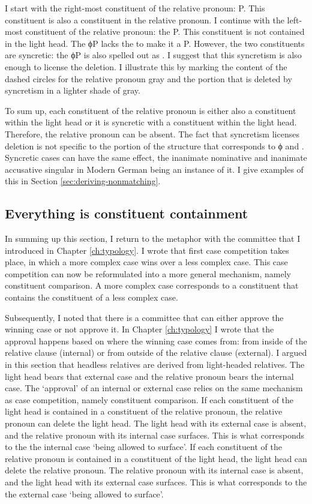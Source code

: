 I start with the right-most constituent of the relative pronoun: P. This constituent is also a constituent in the relative pronoun.
I continue with the left-most constituent of the relative pronoun: the P. This constituent is not contained in the light head. The ϕP lacks the  to make it a P. However, the two constituents are syncretic: the ϕP is also spelled out as . I suggest that this syncretism is also enough to license the deletion. I illustrate this by marking the content of the dashed circles for the relative pronoun gray and the portion that is deleted by syncretism in a lighter shade of gray.

To sum up, each constituent of the relative pronoun is either also a constituent within the light head or it is syncretic with a constituent within the light head. Therefore, the relative pronoun can be absent. The fact that syncretism licenses deletion is not specific to the portion of the structure that corresponds to ϕ and . Syncretic cases can have the same effect, the inanimate nominative and inanimate accusative singular in Modern German being an instance of it. I give examples of this in Section \ref{sec:deriving-nonmatching}.

\subsection{Everything is constituent containment}

In summing up this section, I return to the metaphor with the committee that I introduced in Chapter \ref{ch:typology}. I wrote that first case competition takes place, in which a more complex case wins over a less complex case. This case competition can now be reformulated into a more general mechanism, namely constituent comparison. A more complex case corresponds to a constituent that contains the constituent of a less complex case.

Subsequently, I noted that there is a committee that can either approve the winning case or not approve it. In Chapter \ref{ch:typology} I wrote that the approval happens based on where the winning case comes from: from inside of the relative clause (internal) or from outside of the relative clause (external). I argued in this section that headless relatives are derived from light-headed relatives. The light head bears that external case and the relative pronoun bears the internal case. The `approval' of an internal or external case relies on the same mechanism as case competition, namely constituent comparison. If each constituent of the light head is contained in a constituent of the relative pronoun, the relative pronoun can delete the light head. The light head with its external case is absent, and the relative pronoun with its internal case surfaces. This is what corresponds to the the internal case `being allowed to surface'. If each constituent of the relative pronoun is contained in a constituent of the light head, the light head can delete the relative pronoun. The relative pronoun with its internal case is absent, and the light head with its external case surfaces. This is what corresponds to the the external case `being allowed to surface'.

